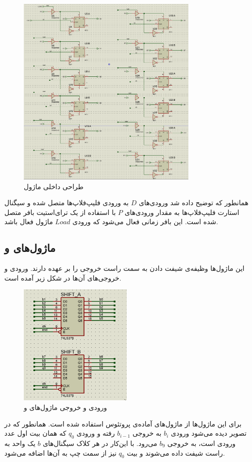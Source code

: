 \documentclass[12pt,onecolumn,a4paper,fleqn]{article}
\begin{document}
	\begin{figure}[H]
		\centering
		\includegraphics[width=0.8\textwidth]{source/reg-in.png}
		\caption{طراحی داخلی ماژول }
		\label{fig:reg-in}
	\end{figure}
	همانطور که توضیح داده شد ورودی‌های $D$ به ورودی فلیپ‌فلاپ‌ها متصل شده و سیگنال‌ استارت فلیپ‌فلاپ‌ها به مقدار ورودی‌های $P$ با استفاده از یک ترای‌استیت بافر متصل شده است. این بافر زمانی فعال می‌شود که ورودی $Load$ ماژول فعال باشد.
	\subsection{ماژول‌های  و }
	این ماژول‌ها وظیفه‌ی شیفت دادن به سمت راست خروجی را بر عهده دارند. ورودی و خروجی‌های آن‌ها در شکل زیر آمده است.
	\begin{figure}[H]
		\centering
		\includegraphics[width=0.5\textwidth]{source/shift.png}
		\caption{ورودی و خروجی ماژول‌های  و }
		\label{fig:shift}
	\end{figure}
	برای این ماژول‌ها از ماژول‌های آماده‌ی پروتئوس استفاده شده است. همانطور که در تصویر دیده می‌شود ورودی $b_i$ به خروجی $b_{i-1}$ رفته و ورودی $q_0$ که همان بیت اول عدد ورودی‌ است، به خروجی $b_9$ می‌رود. با این‌کار در هر کلاک سیگنال‌های $b$‌ یک واحد به راست شیفت داده می‌شوند و بیت $q_0$ نیز از سمت چپ به آن‌ها اضافه می‌شود.
\end{document}

